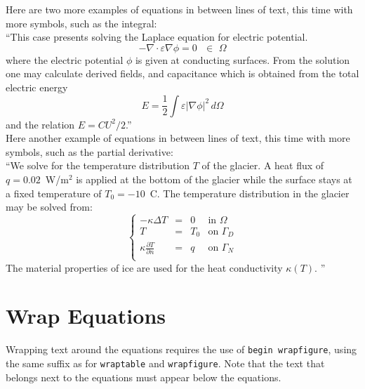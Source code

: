 \noindent Here are two more examples of equations in between lines of text, this time with more symbols, such as the integral:\\

``This case presents solving the Laplace equation for electric potential.
\begin{equation}
  - \nabla \cdot \varepsilon \nabla \phi = 0  \, \, \, \, \in \, \, \Omega
\end{equation}
where the electric potential $\phi$ is given at conducting surfaces.  From the solution one may calculate derived fields, and capacitance which is obtained from the total electric energy 
\begin{equation}
  E=\frac{1}{2} \int \varepsilon | \nabla \phi |^2 \, d\Omega
\end{equation}
and the relation $E=CU^2/2$.''\\

\noindent Here another example of equations in between lines of text, this time with more symbols, such as the partial derivative:\\

``We solve for the temperature distribution $T$ of the glacier. A heat flux of $q=0.02$~W/m$^2$ is applied at the bottom of the glacier while the surface stays at a fixed temperature of $T_0=-10$~C. The temperature distribution in the glacier may be solved from:
\begin{equation}
\left \{
\begin{array}{cccc}
- \kappa \Delta T &= & 0 & \mathrm{ in } \, \, \Omega \\
T&=&T_0 & \mathrm{ on } \, \, \Gamma_D \\
\kappa \frac{\partial T}{\partial n} &=& q & \mathrm{ on } \,\, \Gamma_N \\
\end{array}
\right .
\end{equation}
The material properties of ice are used for the heat conductivity $\kappa(T)$.  ''\\



\section{Wrap Equations}

Wrapping text around the equations requires the use of \texttt{begin wrapfigure}, using the same suffix as for \texttt{wraptable} and \texttt{wrapfigure}.  Note that the text that belongs next to the equations must appear below the equations.\\

